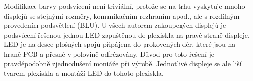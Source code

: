 Modifikace barvy podsvícení není triviální, protože se na trhu vyskytuje mnoho
displejů se stejnými rozměry, komunikačním rozhraním apod., ale s rozdílným
provedením podsvětlení (BLU). U všech autorem zakoupených displejů je
podsvícení řešenou jednou LED zapuštěnou do plexiskla na pravé straně displeje.
LED je na desce plošných spojů připájena do prokovených děr, které jsou na
hraně PCB a přesně v polovině odfrézovány. Důvod pro toto řešení je
pravděpodobně zjednodušení montáže při výrobě. Jednotlivé displeje se ale liší
tvarem plexiskla a montáží LED do tohoto plexiskla.
